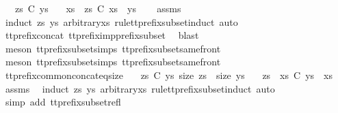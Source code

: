 \begin{isabellebody}
\ \ \ {\isachardoublequoteopen}zs\ {\isasymlesssim}\isactrlsub C\ ys{\isachardoublequoteclose}\isanewline
\ \ \ {\isachardoublequoteopen}xs\ {\isacharat}\ zs\ {\isasymlesssim}\isactrlsub C\ xs\ {\isacharat}\ ys{\isachardoublequoteclose}\isanewline
%
\isadelimproof
\ \ %
\endisadelimproof
%
\isatagproof
{}\isamarkupfalse%
\ assms\ \isamarkupfalse%
\ {\isacharparenleft}induct\ zs\ ys\ arbitrary{\isacharcolon}xs\ rule{\isacharcolon}tt{\isacharunderscore}prefix{\isacharunderscore}subset{\isachardot}induct{\isacharcomma}\ auto{\isacharparenright}\isanewline
\ \ \isamarkupfalse%
\ tt{\isacharunderscore}prefix{\isacharunderscore}concat\ tt{\isacharunderscore}prefix{\isacharunderscore}imp{\isacharunderscore}prefix{\isacharunderscore}subset\ \isamarkupfalse%
\ blast\isanewline
\ \ \isamarkupfalse%
\ {\isacharparenleft}meson\ tt{\isacharunderscore}prefix{\isacharunderscore}subset{\isachardot}simps{\isacharparenleft}{}{\isacharparenright}\ tt{\isacharunderscore}prefix{\isacharunderscore}subset{\isacharunderscore}same{\isacharunderscore}front{\isacharparenright}\isanewline
\ \ \isamarkupfalse%
\ {\isacharparenleft}meson\ tt{\isacharunderscore}prefix{\isacharunderscore}subset{\isachardot}simps{\isacharparenleft}{}{\isacharparenright}\ tt{\isacharunderscore}prefix{\isacharunderscore}subset{\isacharunderscore}same{\isacharunderscore}front{\isacharparenright}%
\endisatagproof
{\isafoldproof}%
%
\isadelimproof
\isanewline
%
\endisadelimproof
\isanewline
{}\isamarkupfalse%
\ tt{\isacharunderscore}prefix{\isacharunderscore}common{\isacharunderscore}concat{\isacharunderscore}eq{\isacharunderscore}size{\isacharcolon}\isanewline
\ \ \ {\isachardoublequoteopen}zs\ {\isasymlesssim}\isactrlsub C\ ys{\isachardoublequoteclose}\ {\isachardoublequoteopen}size\ zs\ {\isacharequal}\ size\ ys{\isachardoublequoteclose}\isanewline
\ \ \ {\isachardoublequoteopen}zs\ {\isacharat}\ xs\ {\isasymlesssim}\isactrlsub C\ ys\ {\isacharat}\ xs{\isachardoublequoteclose}\isanewline
%
\isadelimproof
\ \ %
\endisadelimproof
%
\isatagproof
{}\isamarkupfalse%
\ assms\ \isamarkupfalse%
\ {\isacharparenleft}induct\ zs\ ys\ arbitrary{\isacharcolon}xs\ rule{\isacharcolon}tt{\isacharunderscore}prefix{\isacharunderscore}subset{\isachardot}induct{\isacharcomma}\ auto{\isacharparenright}\isanewline
\ \ \isamarkupfalse%
\ {\isacharparenleft}simp\ add{\isacharcolon}\ tt{\isacharunderscore}prefix{\isacharunderscore}subset{\isacharunderscore}refl{\isacharparenright}%

\end{isabellebody}
